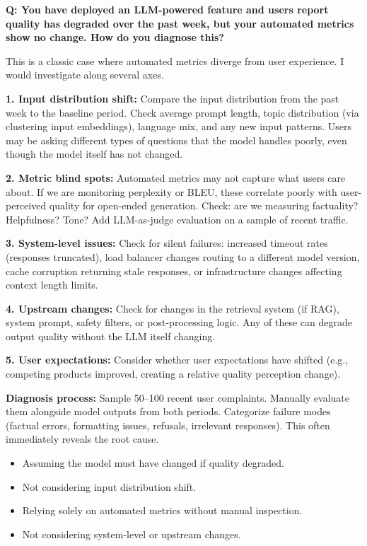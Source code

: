 \begin{interviewq}
\textbf{Q: You have deployed an LLM-powered feature and users report quality has degraded
over the past week, but your automated metrics show no change.  How do you diagnose this?}

 \quad {} \quad \badgefreq{\freqmed}

\stronganswer
This is a classic case where automated metrics diverge from user experience.  I would
investigate along several axes.

\textbf{1. Input distribution shift:}  Compare the input distribution from the past week
to the baseline period.  Check average prompt length, topic distribution (via clustering
input embeddings), language mix, and any new input patterns.  Users may be asking
different types of questions that the model handles poorly, even though the model itself
has not changed.

\textbf{2. Metric blind spots:}  Automated metrics may not capture what users care about.
If we are monitoring perplexity or BLEU, these correlate poorly with user-perceived quality
for open-ended generation.  Check: are we measuring factuality?  Helpfulness?  Tone?
Add LLM-as-judge evaluation on a sample of recent traffic.

\textbf{3. System-level issues:}  Check for silent failures: increased timeout rates
(responses truncated), load balancer changes routing to a different model version,
cache corruption returning stale responses, or infrastructure changes affecting context
length limits.

\textbf{4. Upstream changes:}  Check for changes in the retrieval system (if RAG),
system prompt, safety filters, or post-processing logic.  Any of these can degrade
output quality without the LLM itself changing.

\textbf{5. User expectations:}  Consider whether user expectations have shifted (e.g.,
competing products improved, creating a relative quality perception change).

\textbf{Diagnosis process:}  Sample 50--100 recent user complaints.  Manually evaluate
them alongside model outputs from both periods.  Categorize failure modes (factual errors,
formatting issues, refusals, irrelevant responses).  This often immediately reveals the
root cause.

\redflags
\begin{itemize}
    \item Assuming the model must have changed if quality degraded.
    \item Not considering input distribution shift.
    \item Relying solely on automated metrics without manual inspection.
    \item Not considering system-level or upstream changes.
\end{itemize}


\end{interviewq}
